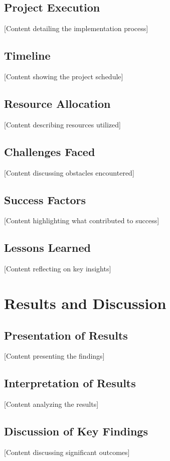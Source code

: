 \documentclass[11pt,a4paper]{article}
\begin{document}
\subsection{Project Execution}
[Content detailing the implementation process]

\subsection{Timeline}
[Content showing the project schedule]

\subsection{Resource Allocation}
[Content describing resources utilized]

\subsection{Challenges Faced}
[Content discussing obstacles encountered]

\subsection{Success Factors}
[Content highlighting what contributed to success]

\subsection{Lessons Learned}
[Content reflecting on key insights]

\section{Results and Discussion}

\subsection{Presentation of Results}
[Content presenting the findings]

\subsection{Interpretation of Results}
[Content analyzing the results]

\subsection{Discussion of Key Findings}
[Content discussing significant outcomes]
\end{document}
